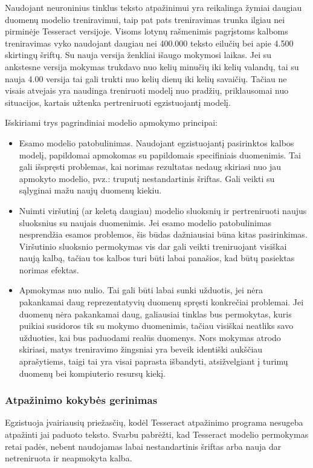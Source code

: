 \documentclass{VUMIFInfBakalaurinis}
\begin{document}
Naudojant neuroninius tinklus teksto atpažinimui yra reikalinga žymiai daugiau duomenų modelio treniravimui, taip pat pats 
treniravimas trunka ilgiau nei pirminėje Tesseract versijoje. Visoms lotynų rašmenimis pagrįstoms kalboms treniravimas vyko naudojant daugiau
nei 400.000 teksto eilučių bei apie 4.500 skirtingų šriftų. Su nauja versija ženkliai išaugo mokymosi laikas. Jei su ankstesne versija mokymas
trukdavo nuo kelių minučių iki kelių valandų, tai su nauja 4.00 versija tai gali trukti nuo kelių dienų iki kelių savaičių.
Tačiau ne visais atvejais yra naudinga treniruoti modelį nuo pradžių, priklausomai nuo situacijos, kartais užtenka pertreniruoti egzistuojantį modelį.

Išskiriami trys pagrindiniai modelio apmokymo principai:
\begin{itemize}[itemsep=0.5pt]
  \item Esamo modelio patobulinimas. Naudojant egzistuojantį pasirinktos kalbos modelį, papildomai apmokomas su papildomais specifiniais duomenimis.
  Tai gali išspręsti problemas, kai norimas rezultatas nedaug skiriasi nuo jau apmokyto modelio, pvz.: truputį nestandartinis šriftas.
  Gali veikti su sąlyginai mažu naujų duomenų kiekiu.
  \item Nuimti viršutinį (ar keletą daugiau) modelio sluoksnių ir pertreniruoti naujus sluoksnius su naujais duomenimis.
  Jei esamo modelio patobulinimas nesprendžia esamos problemos, šis būdas dažniausiai būna kitas pasirinkimas.
  Viršutinio sluoksnio permokymas vis dar gali veikti treniruojant visiškai naują kalbą, tačiau tos kalbos turi būti labai panašios, kad būtų pasiektas norimas efektas.
  \item Apmokymas nuo nulio. Tai gali būti labai sunki užduotis, jei nėra pakankamai daug reprezentatyvių duomenų spręsti konkrečiai problemai.
  Jei duomenų nėra pakankamai daug, galiausiai tinklas bus permokytas, kuris puikiai susidoros tik su mokymo duomenimis, tačiau visiškai neatliks savo užduoties,
  kai bus paduodami realūs duomenys. Nors mokymas atrodo skiriasi, matys treniravimo žingsniai yra beveik identiški aukščiau aprašytiems, taigi tai yra visai paprasta
  išbandyti, atsižvelgiant į turimų duomenų bei kompiuterio resursų kiekį.
\end{itemize}

\subsubsection{Atpažinimo kokybės gerinimas}
Egzistuoja įvairiausių priežasčių, kodėl Tesseract atpažinimo programa nesugeba atpažinti jai paduoto teksto.
Svarbu pabrėžti, kad Tesseract modelio permokymas retai padės, nebent naudojamas labai nestandartinis šriftas arba nauja dar netreniruota ir neapmokyta kalba.
\end{document}
